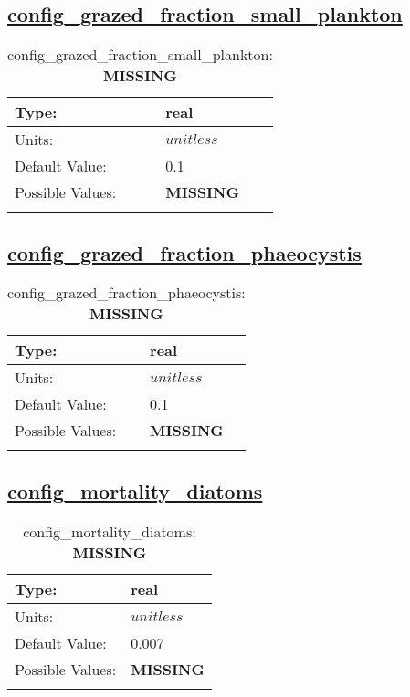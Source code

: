 \subsection[config\_grazed\_fraction\_small\_plankton]{\hyperref[sec:nm_tab_biogeochemistry]{config\_grazed\_fraction\_small\_plankton}}
\label{subsec:nm_sec_config_grazed_fraction_small_plankton}
\begin{center}
\begin{longtable}{| p{2.0in} || p{4.0in} |}
    \hline
    Type: & real \\
    \hline
    Units: & $unitless$ \\
    \hline
    Default Value: & 0.1 \\
    \hline
    Possible Values: & {\bf \color{red} MISSING} \\
    \hline
    \caption{config\_grazed\_fraction\_small\_plankton: {\bf \color{red} MISSING}}
\end{longtable}
\end{center}
\subsection[config\_grazed\_fraction\_phaeocystis]{\hyperref[sec:nm_tab_biogeochemistry]{config\_grazed\_fraction\_phaeocystis}}
\label{subsec:nm_sec_config_grazed_fraction_phaeocystis}
\begin{center}
\begin{longtable}{| p{2.0in} || p{4.0in} |}
    \hline
    Type: & real \\
    \hline
    Units: & $unitless$ \\
    \hline
    Default Value: & 0.1 \\
    \hline
    Possible Values: & {\bf \color{red} MISSING} \\
    \hline
    \caption{config\_grazed\_fraction\_phaeocystis: {\bf \color{red} MISSING}}
\end{longtable}
\end{center}
\subsection[config\_mortality\_diatoms]{\hyperref[sec:nm_tab_biogeochemistry]{config\_mortality\_diatoms}}
\label{subsec:nm_sec_config_mortality_diatoms}
\begin{center}
\begin{longtable}{| p{2.0in} || p{4.0in} |}
    \hline
    Type: & real \\
    \hline
    Units: & $unitless$ \\
    \hline
    Default Value: & 0.007 \\
    \hline
    Possible Values: & {\bf \color{red} MISSING} \\
    \hline
    \caption{config\_mortality\_diatoms: {\bf \color{red} MISSING}}
\end{longtable}
\end{center}
